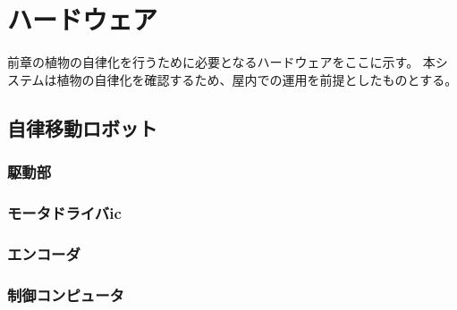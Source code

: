 \chapter{ハードウェア}
前章の植物の自律化を行うために必要となるハードウェアをここに示す。
本システムは植物の自律化を確認するため、屋内での運用を前提としたものとする。

\section{自律移動ロボット}

\subsection{駆動部}

\subsection{モータドライバic}
\subsection{エンコーダ}
\subsection{制御コンピュータ}
